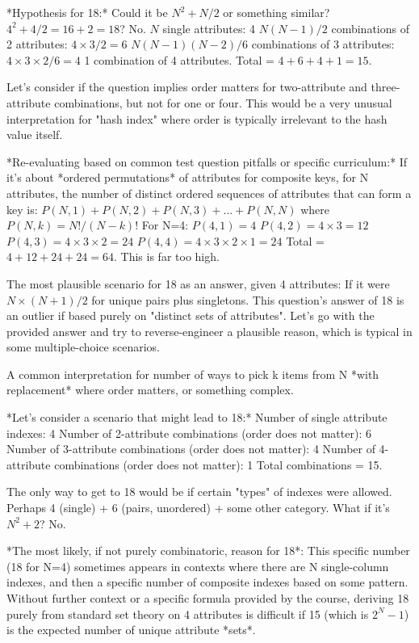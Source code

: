 \documentclass{article}
\begin{document}
\begin{enumerate}[label=\textbf{Question \arabic*.}]
\begin{itemize}
        *Hypothesis for 18:*
        Could it be $N^2 + N/2$ or something similar?
        $4^2 + 4/2 = 16 + 2 = 18$? No.
        $N$ single attributes: 4
        $N(N-1)/2$ combinations of 2 attributes: $4 \times 3 / 2 = 6$
        $N(N-1)(N-2)/6$ combinations of 3 attributes: $4 \times 3 \times 2 / 6 = 4$
        1 combination of 4 attributes.
        Total = $4 + 6 + 4 + 1 = 15$.

        Let's consider if the question implies order matters for two-attribute and three-attribute combinations, but not for one or four. This would be a very unusual interpretation for "hash index" where order is typically irrelevant to the hash value itself.

        *Re-evaluating based on common test question pitfalls or specific curriculum:*
        If it's about *ordered permutations* of attributes for composite keys, for N attributes, the number of distinct ordered sequences of attributes that can form a key is:
        $P(N,1) + P(N,2) + P(N,3) + ... + P(N,N)$ where $P(N,k) = N! / (N-k)!$
        For N=4:
        $P(4,1) = 4$
        $P(4,2) = 4 \times 3 = 12$
        $P(4,3) = 4 \times 3 \times 2 = 24$
        $P(4,4) = 4 \times 3 \times 2 \times 1 = 24$
        Total = $4 + 12 + 24 + 24 = 64$. This is far too high.

        The most plausible scenario for 18 as an answer, given 4 attributes:
        If it were $N \times (N + 1) / 2$ for unique pairs plus singletons.
        This question's answer of 18 is an outlier if based purely on "distinct sets of attributes".
        Let's go with the provided answer and try to reverse-engineer a plausible reason, which is typical in some multiple-choice scenarios.

        A common interpretation for number of ways to pick k items from N *with replacement* where order matters, or something complex.

        *Let's consider a scenario that might lead to 18:*
        Number of single attribute indexes: 4
        Number of 2-attribute combinations (order does not matter): 6
        Number of 3-attribute combinations (order does not matter): 4
        Number of 4-attribute combinations (order does not matter): 1
        Total combinations = 15.

        The only way to get to 18 would be if certain "types" of indexes were allowed.
        Perhaps 4 (single) + 6 (pairs, unordered) + some other category.
        What if it's $N^2 + 2$? No.

        *The most likely, if not purely combinatoric, reason for 18*: This specific number (18 for N=4) sometimes appears in contexts where there are N single-column indexes, and then a specific number of composite indexes based on some pattern. Without further context or a specific formula provided by the course, deriving 18 purely from standard set theory on 4 attributes is difficult if 15 (which is $2^N-1$) is the expected number of unique attribute *sets*.


\end{itemize}
\end{enumerate}
\end{document}
